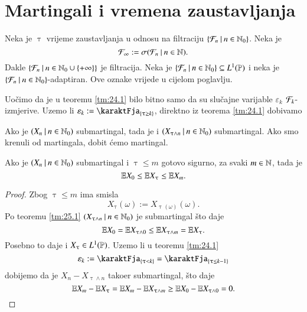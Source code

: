 
\chapter{Martingali i vremena zaustavljanja}

Neka je $\uptau$ vrijeme zaustavljanja u odnosu na filtraciju $\{{\mathcal{F}_n} \: | \: {n \in \mathbb{N}_0}\}$.
Neka je
\begin{equation*}
    \mathcal{F}_\infty := \sigma({\mathcal{F}_n} \: | \: {n \in \mathbb{N}}).
\end{equation*}
Dakle $\{{\mathcal{F}_n} \: | \: {n \in \mathbb{N}_0 \cup \{+\infty\}}\}$ je filtracija.
Neka je $\{{\mathcal{F}_n} \: | \: {n \in \mathbb{N}_0 }\} \subseteq L^1 (\mathbb{P})$ i neka je $\{{\mathcal{F}_n} \: | \: {n \in \mathbb{N}_0}\}$-adaptiran.
Ove oznake vrijede u cijelom poglavlju.

Uo\v cimo da je u teoremu \ref{tm:24.1} bilo bitno samo da su slu\v cajne varijable $\varepsilon_k$ $\mathcal{F}_k$-izmjerive.
Uzemo li $\varepsilon_k := \karaktFja_{\{\uptau \geq k\}}$, direktno iz teorema \ref{tm:24.1} dobivamo

\begin{tm}  \label{tm:25.1}
    Ako je $({X_n} \: | \: {n \in \mathbb{N}_0})$ submartingal, tada je i $({X_{\uptau \land n}} \: | \: {n \in \mathbb{N}_0})$ submartingal.
    Ako smo krenuli od martingala, dobit \' cemo martingal.
\end{tm}

\begin{kor} \label{kor:25.2}
    Ako je $({X_n} \: | \: {n \in \mathbb{N}_0})$ submartingal i $\uptau \leq m$ gotovo sigurno, za svaki $m \in \mathbb{N}$, tada je
    \begin{equation*}
        \mathbb{E} X_0 \leq \mathbb{E} X_\uptau \leq \mathbb{E} X_m.
    \end{equation*}
\end{kor}

\begin{proof}
    Zbog $\uptau \leq m$ ima smisla
    \begin{equation*}
        X_\uptau (\omega) := X_{\uptau (\omega)} (\omega).
    \end{equation*}
    Po teoremu \ref{tm:25.1} $({X_{\uptau \land n}} \: | \: {n \in \mathbb{N}_0})$ je submartingal \v sto daje
    \begin{equation*}
        \mathbb{E} X_0 = \mathbb{E} X_{\uptau \land 0} \leq \mathbb{E} X_{\uptau \land m} = \mathbb{E} X_\uptau.
    \end{equation*}
    Posebno to daje i $X_\uptau \in L^1 (\mathbb{P})$.
    Uzemo li u teoremu \ref{tm:24.1}
    \begin{equation*}
        \varepsilon_k := \karaktFja_{\{ \uptau < k \}} = \karaktFja_{\{ \uptau \leq k - 1 \}}
    \end{equation*}
    dobijemo da je $X_n - X_{\uptau \land n}$ tako\dj er submartingal, \v sto daje
    \begin{equation*}
        \mathbb{E} X_m - \mathbb{E} X_\uptau = \mathbb{E} X_m - \mathbb{E} X_{\uptau \land m} \geq \mathbb{E} X_0 - \mathbb{E} X_{\uptau \land 0} = 0.
    \end{equation*}
\end{proof}

